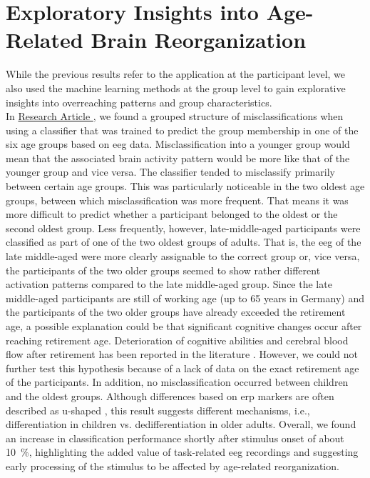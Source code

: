\section{Exploratory Insights into Age-Related Brain Reorganization}
While the previous results refer to the application at the participant level, we also used the machine learning methods at the group level to gain explorative insights into overreaching patterns and group characteristics.\\
In \hyperref[results:paperII]{Research Article }, we found a grouped structure of misclassifications when using a classifier that was trained to predict the group membership in one of the six age groups based on \gls{eeg} data. Misclassification into a younger group would mean that the associated brain activity pattern would be more like that of the younger group and vice versa. The classifier tended to misclassify primarily between certain age groups. This was particularly noticeable in the two oldest age groups, between which misclassification was more frequent. That means it was more difficult to predict whether a participant belonged to the oldest or the second oldest group. Less frequently, however, late-middle-aged participants were classified as part of one of the two oldest groups of adults. That is, the \gls{eeg} of the late middle-aged were more clearly assignable to the correct group or, vice versa, the participants of the two older groups seemed to show rather different activation patterns compared to the late middle-aged group. Since the late middle-aged participants are still of working age (up to 65 years in Germany) and the participants of the two older groups have already exceeded the retirement age, a possible explanation could be that significant cognitive changes occur after reaching retirement age. Deterioration of cognitive abilities and cerebral blood flow after retirement has been reported in the literature \cite{Celidoni2017, Rohwedder2010, Rogers1990}. However, we could not further test this hypothesis because of a lack of data on the exact retirement age of the participants. In addition, no misclassification occurred between children and the oldest groups. Although differences based on \gls{erp} markers are often described as u-shaped \cite{Mueller2008, Reuter2019}, this result suggests different mechanisms, i.e., differentiation in children vs. dedifferentiation in older adults. Overall, we found an increase in classification performance shortly after stimulus onset of about 10~\%, highlighting the added value of task-related \gls{eeg} recordings and suggesting early processing of the stimulus to be affected by age-related reorganization.\\
